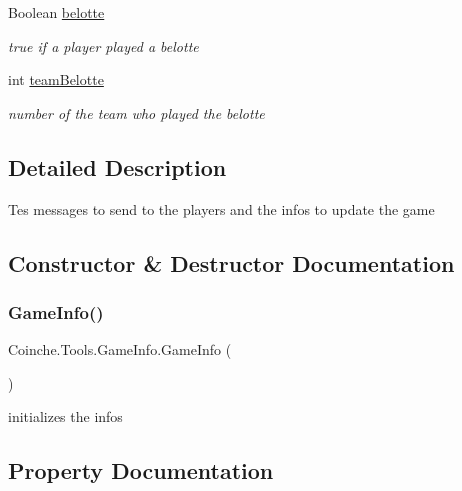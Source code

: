 \begin{DoxyCompactItemize}
Boolean \hyperlink{class_coinche_1_1_tools_1_1_game_info_a07ac8659592be6506ea001886ef527d9}{belotte}
\begin{DoxyCompactList}\small\item\em true if a player played a belotte \end{DoxyCompactList}\item 
int \hyperlink{class_coinche_1_1_tools_1_1_game_info_a43774aa31b83dd09b096074590c2448f}{team\+Belotte}
\begin{DoxyCompactList}\small\item\em number of the team who played the belotte \end{DoxyCompactList}\end{DoxyCompactItemize}


\subsection{Detailed Description}
Tes messages to send to the players and the infos to update the game 



\subsection{Constructor \& Destructor Documentation}
\mbox{\label{class_coinche_1_1_tools_1_1_game_info_a3c766aced6b335c4888fd5fd06ca098f}} 
\subsubsection{\texorpdfstring{Game\+Info()}{GameInfo()}}
{\footnotesize\ttfamily Coinche.\+Tools.\+Game\+Info.\+Game\+Info (\begin{DoxyParamCaption}{ }\end{DoxyParamCaption})\hspace{0.3cm}{\ttfamily [inline]}}



initializes the infos 



\subsection{Property Documentation}
\mbox{\label{class_coinche_1_1_tools_1_1_game_info_aed3eb9ce4d7328b7db337cc90b48d672}} 
